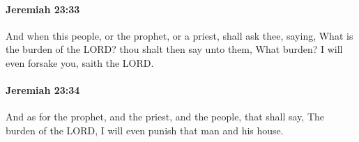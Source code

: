		\paragraph{Jeremiah 23:33} %
			\label{JEREMIAH-23-33}

			And when this people, or the prophet, or a priest, shall ask thee, saying, What is the burden of the LORD? thou shalt then say unto them, What burden? I will even forsake you, saith the LORD.


		\paragraph{Jeremiah 23:34} %
			\label{JEREMIAH-23-34}

			And as for the prophet, and the priest, and the people, that shall say, The burden of the LORD, I will even punish that man and his house.


